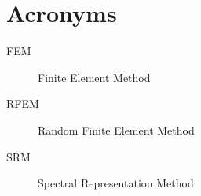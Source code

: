 
\chapter{Acronyms}
\begin{description}
\item[FEM] Finite Element Method
\item[RFEM] Random Finite Element Method
\item[SRM] Spectral Representation Method


\end{description}
